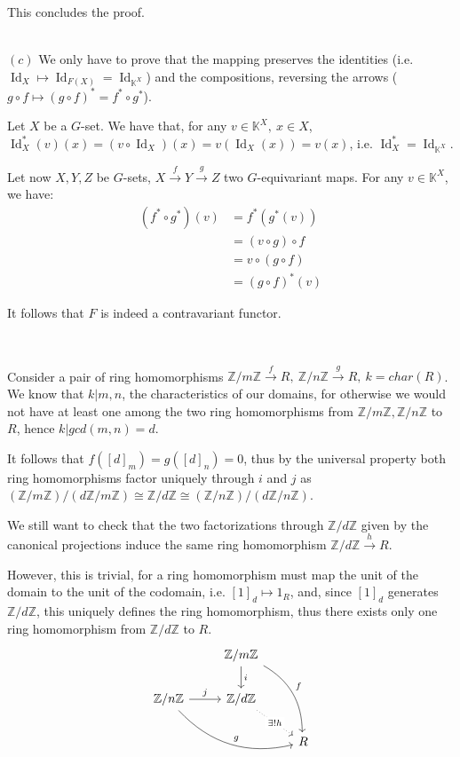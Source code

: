 \documentclass{article}
\newcommand{\numberset}{\mathbb}
\newcommand{\Z}{\numberset{Z}}
\newcommand{\K}{\numberset{K}}
\newcommand{\exercise}[1]{\noindent {\bf Exercise #1}}
\DeclareMathOperator{\Id}{Id}
\begin{document}
This concludes the proof.

~\\
$(c)$ We only have to prove that the mapping preserves the identities (i.e.
$\Id_X\mapsto\Id_{F(X)}=\Id_{\K^X}$) and the compositions, reversing the arrows
($g\circ f\mapsto (g\circ f)^*=f^*\circ g^*$).

Let $X$ be a $G$-set. We have that, for any $v\in\K^X,\ x\in X$,
$\Id_X^*(v)(x)=(v\circ\Id_X)(x)=v(\Id_X(x))=v(x)$, i.e. $\Id_X^*=\Id_{\K^X}$.

Let now $X,Y,Z$ be $G$-sets, $X\xrightarrow{f}Y\xrightarrow{g}Z$ two 
$G$-equivariant maps. For any $v\in\K^X$, we have:
\begin{align*}
    (f^*\circ g^*)(v) & = f^*(g^*(v)) \\
    & = (v\circ g)\circ f \\
    & = v\circ (g\circ f) \\
    & = (g\circ f)^*(v)
\end{align*}

It follows that $F$ is indeed a contravariant functor.


~\\
\exercise{4.8}

Consider a pair of ring homomorphisms $\Z/m\Z\xrightarrow{f}R,\
\Z/n\Z\xrightarrow{g}R,\ k=char(R)$. We know that $k|m,n$, the characteristics
of our domains, for otherwise we would not have at least one among the two ring
homomorphisms from $\Z/m\Z,\Z/n\Z$ to $R$, hence $k|gcd(m,n)=d$.

It follows that $f([d]_m)=g([d]_n)=0$, thus by the universal property both ring
homomorphisms factor uniquely through $i$ and $j$ as $(\Z/m\Z)/(d\Z/m\Z)\cong
\Z/d\Z\cong(\Z/n\Z)/(d\Z/n\Z)$.

We still want to check that the two factorizations through $\Z/d\Z$ given by the
canonical projections induce the same ring homomorphism $\Z/d\Z\xrightarrow{h} R$.

However, this is trivial, for a ring homomorphism must map the unit of the
domain to the unit of the codomain, i.e. $[1]_d\mapsto 1_R$, and, since $[1]_d$
generates $\Z/d\Z$, this uniquely defines the ring homomorphism, thus there
exists only one ring homomorphism from $\Z/d\Z$ to $R$.
\[
    \begin{tikzcd}
        & \Z/m\Z\arrow{d}{i}\arrow[bend left]{ddr}{f} \\
        \Z/n\Z\arrow{r}{j}\arrow[bend right]{drr}{g}
        & \Z/d\Z\arrow[dotted]{dr}[description]{\exists! h} \\
        && R
    \end{tikzcd}
\]

\printbibliography
\end{document}
